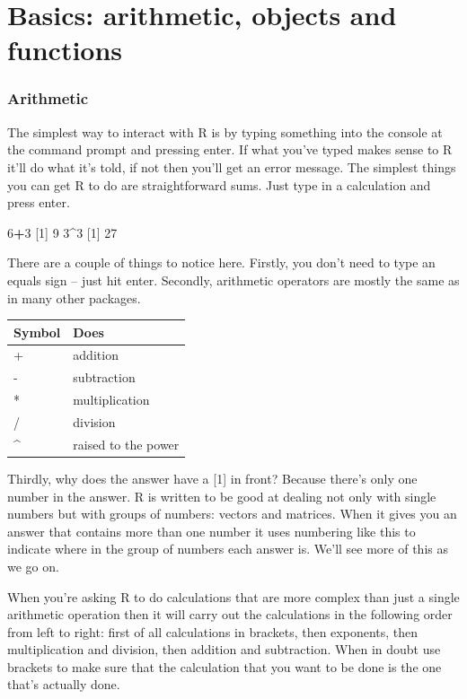 \documentclass[
]{book}
\newenvironment{Shaded}{\begin{snugshade}}{\end{snugshade}}
\newcommand{\DecValTok}[1]{\textcolor[rgb]{0.00,0.00,0.81}{#1}}
\newcommand{\NormalTok}[1]{#1}
\newcommand{\OperatorTok}[1]{\textcolor[rgb]{0.81,0.36,0.00}{\textbf{#1}}}
\begin{document}
\hypertarget{basics-arithmetic-objects-and-functions}{%
\chapter{Basics: arithmetic, objects and functions}\label{basics-arithmetic-objects-and-functions}}

\hypertarget{arithmetic}{%
\subsection{Arithmetic}\label{arithmetic}}

The simplest way to interact with R is by typing something into the console at the command prompt and pressing enter. If what you've typed makes sense to R it'll do what it's told, if not then you'll get an error message. The simplest things you can get R to do are straightforward sums. Just type in a calculation and press enter.

\begin{Shaded}
\begin{Highlighting}[]
\DecValTok{6}\OperatorTok{+}\DecValTok{3}
\NormalTok{[}\DecValTok{1}\NormalTok{] }\DecValTok{9}
\DecValTok{3}\OperatorTok{^}\DecValTok{3}
\NormalTok{[}\DecValTok{1}\NormalTok{] }\DecValTok{27}
\end{Highlighting}
\end{Shaded}

There are a couple of things to notice here. Firstly, you don't need to type an equals sign -- just hit enter. Secondly, arithmetic operators are mostly the same as in many other packages.

\begin{longtable}[]{@{}ll@{}}
\toprule
Symbol & Does\tabularnewline
\midrule
\endhead
+ & addition\tabularnewline
- & subtraction\tabularnewline
* & multiplication\tabularnewline
/ & division\tabularnewline
\^{} & raised to the power\tabularnewline
\bottomrule
\end{longtable}

Thirdly, why does the answer have a {[}1{]} in front? Because there's only one number in the answer. R is written to be good at dealing not only with single numbers but with groups of numbers: vectors and matrices. When it gives you an answer that contains more than one number it uses numbering like this to indicate where in the group of numbers each answer is. We'll see more of this as we go on.

When you're asking R to do calculations that are more complex than just a single arithmetic operation then it will carry out the calculations in the following order from left to right: first of all calculations in brackets, then exponents, then multiplication and division, then addition and subtraction. When in doubt use brackets to make sure that the calculation that you want to be done is the one that's actually done.
\end{document}

